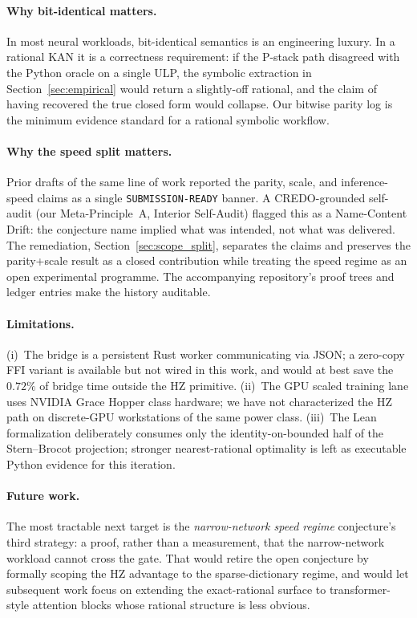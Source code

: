 \documentclass[11pt,a4paper]{article}
\begin{document}
\paragraph{Why bit-identical matters.}
In most neural workloads, bit-identical semantics is an engineering
luxury. In a rational KAN it is a correctness requirement: if the
P-stack path disagreed with the Python oracle on a single ULP, the
symbolic extraction in Section~\ref{sec:empirical} would return a
slightly-off rational, and the claim of having recovered the true
closed form would collapse. Our bitwise parity log is the minimum
evidence standard for a rational symbolic workflow.

\paragraph{Why the speed split matters.}
Prior drafts of the same line of work reported the parity, scale, and
inference-speed claims as a single \texttt{SUBMISSION-READY} banner.
A CREDO-grounded self-audit (our Meta-Principle~A, Interior
Self-Audit) flagged this as a Name-Content Drift: the conjecture
name implied what was intended, not what was delivered. The
remediation, Section~\ref{sec:scope_split}, separates the claims and
preserves the parity+scale result as a closed contribution while
treating the speed regime as an open experimental programme. The
accompanying repository's proof trees and ledger entries make the
history auditable.

\paragraph{Limitations.}
(i)~The bridge is a persistent Rust worker communicating via JSON; a
zero-copy FFI variant is available but not wired in this work, and
would at best save the $0.72\%$ of bridge time outside the HZ primitive.
(ii)~The GPU scaled training lane uses NVIDIA Grace Hopper class
hardware; we have not characterized the HZ path on discrete-GPU
workstations of the same power class.
(iii)~The Lean formalization deliberately consumes only the
identity-on-bounded half of the Stern--Brocot projection; stronger
nearest-rational optimality is left as executable Python evidence for
this iteration.

\paragraph{Future work.}
The most tractable next target is the \emph{narrow-network speed
regime} conjecture's third strategy: a proof, rather than a measurement,
that the narrow-network workload cannot cross the gate. That would
retire the open conjecture by formally scoping the HZ advantage to the
sparse-dictionary regime, and would let subsequent work focus on
extending the exact-rational surface to transformer-style attention
blocks whose rational structure is less obvious.
\end{document}
